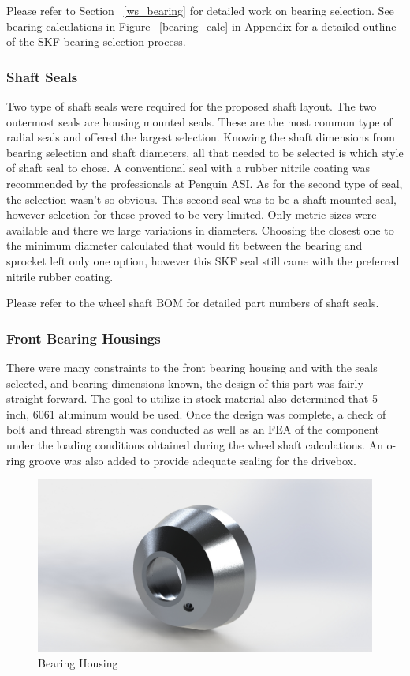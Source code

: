 Please refer to Section ~\ref{ws_bearing} for detailed work on bearing selection. See bearing calculations in Figure ~\ref{bearing_calc} in Appendix for a detailed outline of the SKF bearing selection process.

\subsubsection{Shaft Seals}
Two type of shaft seals were required for the proposed shaft layout. The two outermost seals are housing mounted seals. These are the most common type of radial seals and offered the largest selection. Knowing the shaft dimensions from bearing selection and shaft diameters, all that needed to be selected is which style of shaft seal to chose. A conventional seal with a rubber nitrile coating was recommended by the professionals at Penguin ASI. As for the second type of seal, the selection wasn't so obvious. This second seal was to be a shaft mounted seal, however selection for these proved to be very limited. Only metric sizes were available and there we large variations in diameters. Choosing the closest one to the minimum diameter calculated that would fit between the bearing and sprocket left only one option, however this SKF seal still came with the preferred nitrile rubber coating.

Please refer to the wheel shaft BOM for detailed part numbers of shaft seals.

\subsubsection{Front Bearing Housings}
There were many constraints to the front bearing housing and with the seals selected, and bearing dimensions known, the design of this part was fairly straight forward. The goal to utilize in-stock material also determined that 5 inch, 6061 aluminum would be used. Once the design was complete, a check of bolt and thread strength was conducted as well as an FEA of the component under the loading conditions obtained during the wheel shaft calculations. An o-ring groove was also added to provide adequate sealing for the drivebox.

\begin{figure}[h]\centering
	\includegraphics[width=.7\linewidth]{dom/hub_iso_rndr.jpg}
	\caption{Bearing Housing}
	\label{fig:housing}
\end{figure}

